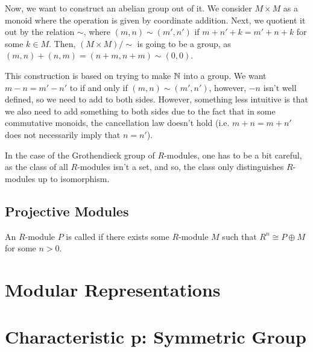 \documentclass{article}
\begin{document}
Now, we want to construct an abelian group out of it. We consider $M \times M$ as a monoid where the operation is given by coordinate addition. Next, we quotient it out by the relation $\sim$, where $(m,n) \sim (m',n')$ if $m+n'+k = m'+n+k$ for some $k \in M$. Then, $(M \times M)/\sim$ is going to be a group, as $(m,n)+(n,m) = (n+m,n+m) \sim (0,0)$.

This construction is based on trying to make $\mathbb N$ into a group. We want $m-n=m'-n'$ to if and only if $(m,n) \sim (m',n')$, however, $-n$ isn't well defined, so we need to add to both sides. However, something less intuitive is that we also need to add something to both sides due to the fact that in some commutative monoids, the cancellation law doesn't hold (i.e. $m+n=m+n'$ does not necessarily imply that $n=n'$).

In the case of the Grothendieck group of $R$-modules, one has to be a bit careful, as the class of all $R$-modules isn't a set, and so, the class only distinguishes $R$-modules up to isomorphism. 

\subsection{Projective Modules}

\begin{definition}
An $R$-module $P$ is called  if there exists some $R$-module $M$ such that $R^n \cong P \oplus M$ for some $n > 0$. 
\end{definition}


\section{Modular Representations}



\section{Characteristic p: Symmetric Group}
\end{document}
